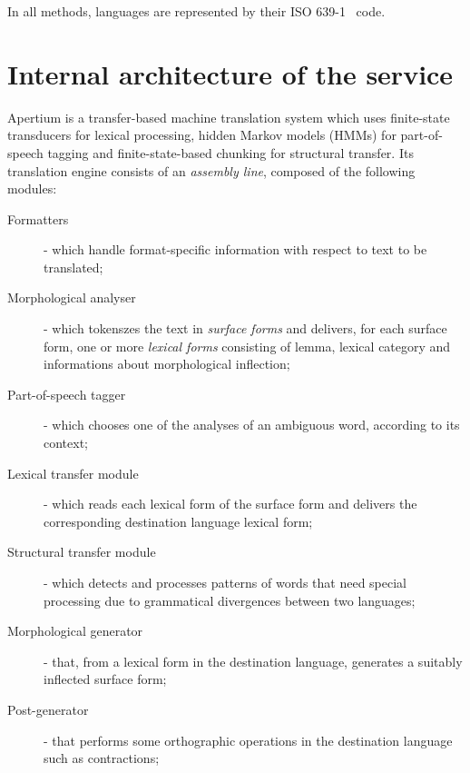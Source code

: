\documentclass[11pt]{article}
\begin{document}
In all methods, languages are represented by their ISO 639-1~\citep{ISO:639-1} code.



\section{Internal architecture of the service}

Apertium is a transfer-based machine translation system which uses 
finite-state transducers for lexical processing, hidden Markov models (HMMs) 
for part-of-speech tagging and finite-state-based chunking for structural 
transfer. Its translation engine consists of an \emph{assembly line}, 
composed of the following modules:

\begin{description}
 \item[Formatters] - which handle format-specific information with respect to text to be translated;
 \item[Morphological analyser] - which tokenszes the text in \emph{surface forms} and delivers, 
       for each surface form, one or more \emph{lexical forms} consisting of lemma, lexical 
       category and informations about morphological inflection;
 \item[Part-of-speech tagger] - which chooses one of the analyses of an ambiguous word, according 
       to its context;
 \item[Lexical transfer module] - which reads each lexical form of the surface form and delivers  
       the corresponding destination language lexical form;
 \item[Structural transfer module] - which detects and processes patterns of words that need special 
       processing due to grammatical divergences between two languages;
 \item[Morphological generator] - that, from a lexical form in the destination language, generates 
       a suitably inflected surface form;
 \item[Post-generator] - that performs some orthographic operations in the destination language 
       such as contractions;
\end{description}


\end{document}
